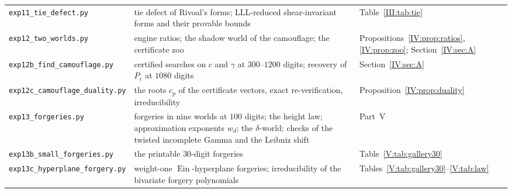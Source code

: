 \documentclass[11pt,a4paper]{article}
\newcommand{\Ein}{\operatorname{Ein}}
\theoremstyle{definition}
\theoremstyle{remark}
\numberwithin{equation}{section}
\begin{document}
\begin{footnotesize}
\begin{longtable}{@{}>{\raggedright\arraybackslash}p{47mm}>{\raggedright\arraybackslash}p{77mm}>{\raggedright\arraybackslash}p{24mm}@{}}
\texttt{exp11\_tie\_defect.py} & tie defect of Rivoal's forms; LLL-reduced shear-invariant forms and their provable bounds & Table~\ref{III:tab:tie}\\
\texttt{exp12\_two\_worlds.py} & engine ratios; the shadow world of the camouflage; the certificate zoo & Propositions~\ref{IV:prop:ratios}, \ref{IV:prop:zoo}; Section~\ref{IV:sec:A}\\
\texttt{exp12b\_find\_camouflage.py} & certified searches on $c$ and $\gamma$ at $300$--$1200$ digits; recovery of $P_c$ at $1080$ digits & Section~\ref{IV:sec:A}\\
\texttt{exp12c\_camouflage\_duality.py} & the roots $c_p$ of the certificate vectors, exact re-verification, irreducibility & Proposition~\ref{IV:prop:duality}\\
\texttt{exp13\_forgeries.py} & forgeries in nine worlds at $100$ digits; the height law; approximation exponents $w_d$; the $\delta$-world; checks of the twisted incomplete Gamma and the Leibniz shift & Part~V\\
\texttt{exp13b\_small\_forgeries.py} & the printable $30$-digit forgeries & Table~\ref{V:tab:gallery30}\\
\texttt{exp13c\_hyperplane\_forgery.py} & weight-one $\Ein$-hyperplane forgeries; irreducibility of the bivariate forgery polynomials & Tables~\ref{V:tab:gallery30}--\ref{V:tab:law}\\
\bottomrule
\end{longtable}
\end{footnotesize}
\end{document}
